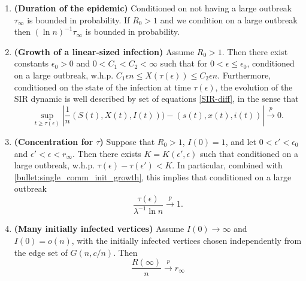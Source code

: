 \documentclass[11pt]{article}
\begin{document}
\begin{theorem}
\begin{enumerate}[label=(\alph*)]
    \item\textbf{(Duration of the epidemic)}\label{bullet:final-time}
    Conditioned on not having a large outbreak  $\tau_\infty$ is bounded in probability.  If $R_0>1$ and we condition on a large outbreak then $(\ln n)^{-1}\tau_\infty$ is bounded in probability.
    
    \item\textbf{(Growth of a linear-sized infection)}\label{bullet:single_comm_diff_eq} 
    Assume $R_0>1$.  Then there exist constants $\epsilon_0>0$ and $0<C_1<C_2<\infty$ such that for $0<\epsilon\leq \epsilon_0$, conditioned on a large outbreak, w.h.p.  $C_1\epsilon n \leq X(\tau(\epsilon))\leq C_2\epsilon n$.
    Furthermore, conditioned on the state of the infection at time $\tau(\epsilon)$, the evolution of the SIR dynamic is well described by set of equations \eqref{SIR-diff}, in the sense that 
    $$\sup_{t\geq \tau(\epsilon)}\left|\frac 1n(S(t),X(t), I(t)))-(s(t), x(t), i(t))\right| \overset{p}{\to}0.$$

    \item\textbf{(Concentration for $\tau$)}\label{bullet:single_comm_tau_concentration} Suppose that $R_0>1$, $I(0) = 1$, and let $0<\epsilon'<\epsilon_0$ and $\epsilon'<\epsilon<r_\infty$. Then there exists $K=K(\epsilon', \epsilon)$ such that conditioned on a large outbreak,     
    w.h.p. $\tau(\epsilon) - \tau(\epsilon')< K$. In particular, combined with \ref{bullet:single_comm_init_growth}, this implies that conditioned on a large outbreak
    \begin{equation*}\label{eqn_T_limit}
        \frac{\tau(\epsilon)}{\lambda^{-1}\ln n} \overset{p}{\to} 1.
    \end{equation*}

 

    \item\textbf{(Many initially infected vertices)}\label{bullet:LargeI0} 
    Assume $I(0)\to\infty$ and $I(0)=o(n)$,  with the initially infected vertices chosen independently from the edge set of $G(n,c/n)$.  
    Then 
   \begin{equation*}
        \frac{R(\infty)}{n} \overset{p}{\to} r_\infty
    \end{equation*}

\end{enumerate}

\end{theorem}
\end{document}
